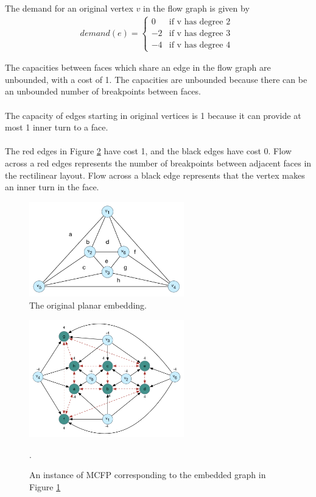 \documentclass[12pt]{article}
\begin{document}
The demand for an original vertex $v$ in the flow graph is given by
\begin{align*}
    demand(e) = \begin{cases} 0 & \text{if v has degree 2}\\ -2 & \text{if v has degree 3} \\ -4 & \text{if v has degree 4 } \end{cases}
\end{align*}

The capacities between faces which share an edge in the flow graph are unbounded, with a cost of 1. The capacities are unbounded because there can be an unbounded number of breakpoints between faces.\\
\\
The capacity of edges starting in original vertices is 1 because it can provide at most 1 inner turn to a face.\\
\\
The red edges in Figure \ref{fig:mcfp_instance} have cost 1, and the black edges have cost 0. Flow across a red edges represents the number of breakpoints between adjacent faces in the rectilinear layout. Flow across a black edge represents that the vertex makes an inner turn in the face.\\

\begin{figure}[h]
  \centering
    \includegraphics[width=0.6\textwidth]{figures/e2_5_planar_embedding}
  \caption{The original planar embedding.}
  \label{fig:planar_embedding}
\end{figure}

\begin{figure}[h]
  \centering
    \includegraphics[width=0.6\textwidth]{figures/e2_5}
  \caption{An instance of MCFP corresponding to the embedded graph in Figure \ref{fig:planar_embedding}}.
  \label{fig:mcfp_instance}
\end{figure}
\end{document}
